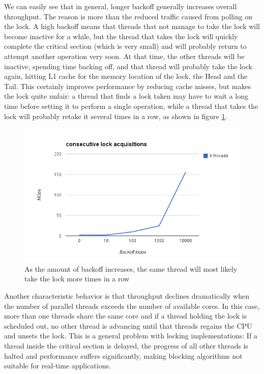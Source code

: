 We can easily see that in general, longer backoff generally increases overall throughput. The reason is more than the reduced traffic caused from polling on the lock. A high backoff means that threads that not manage to take the lock will become inactive for a while, but the thread that takes the lock will quickly complete the critical section (which is very small) and will probably return to attempt another operation very soon. At that time, the other threads will be inactive, spending time backing off, and that thread will probably take the lock again, hitting L1 cache for the memory location of the lock, the Head and the Tail. This certainly improves performance by reducing cache misses, but makes the lock quite unfair: a thread that finds a lock taken may have to wait a long time before setting it to perform a single operation, while a thread that takes the lock will probably retake it several times in a row, as shown in figure \ref{queue_conseq_acq}.   

\begin{figure}
 \centering
  \includegraphics[scale=0.7]{queue_conseq_acq.png}
\caption{As the amount of backoff increases, the same thread will most likely take the lock more times in a row}
\label{queue_conseq_acq}
\end{figure}
Another characteristic behavior is that throughput declines dramatically when the number of parallel threads exceeds the number of available cores. In this case, more than one threads share the same core and if a thread holding the lock is scheduled out, no other thread is advancing until that threads regains the CPU and unsets the lock. This is a general problem with locking implementations: If a thread inside the critical section is delayed, the progress of all other threads is halted and performance suffers significantly, making blocking algorithms not suitable for real-time applications.


